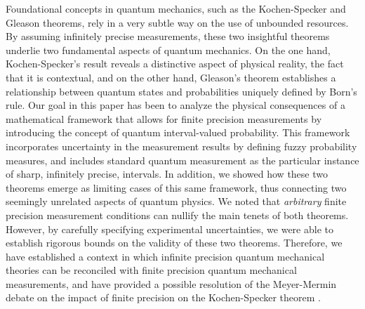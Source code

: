 \documentclass[english,reprint, aps, prl,superscriptaddress, showpacs,
showkeys, longbibliography, amsmath, amssymb]{revtex4-1}
\theoremstyle{plain}
\theoremstyle{definition}
\begin{document}
Foundational concepts in quantum mechanics, such as the Kochen-Specker and
Gleason theorems, rely in a very subtle way on the use of
unbounded resources. By assuming infinitely precise measurements,
these two insightful theorems underlie two fundamental aspects of
quantum mechanics. On the one hand, Kochen-Specker's result reveals a distinctive aspect of physical reality, the fact that it is contextual, and on the other hand, Gleason's theorem establishes a
relationship between quantum states and probabilities uniquely defined
by Born's rule.  Our goal
in this paper has been to analyze the physical consequences of a
mathematical framework that allows for finite precision measurements
by introducing the concept of quantum interval-valued probability. This
framework incorporates uncertainty in the measurement results by defining
fuzzy probability measures, and includes standard quantum measurement
as the particular instance of sharp, infinitely precise, intervals.
In addition, we showed how these two theorems emerge as limiting cases
of this same framework, thus connecting two seemingly unrelated
aspects of quantum physics. We noted that
{\it arbitrary\/} finite precision measurement conditions can nullify the main
tenets of both theorems. However, by carefully specifying experimental uncertainties, we were able to establish rigorous bounds on the validity of these two theorems. Therefore, we have established a context in which infinite precision quantum mechanical theories can be reconciled with finite precision quantum mechanical measurements, and have provided a possible resolution of the Meyer-Mermin debate on the impact of finite precision on the Kochen-Specker theorem \cite{PhysRevLett.83.3751,Mermin1999}.



\end{document}
